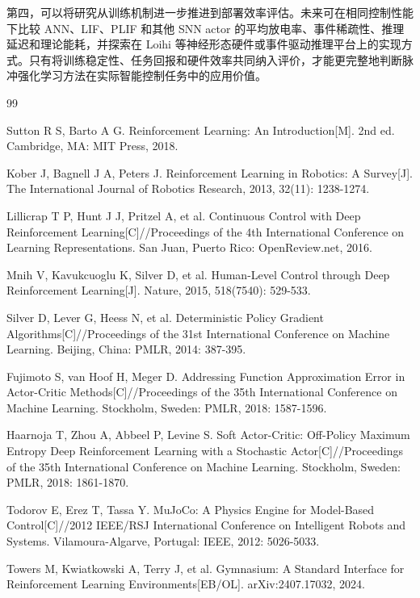 \documentclass[UTF8,zihao=-4,oneside,openany]{ctexbook}
\begin{document}
第四，可以将研究从训练机制进一步推进到部署效率评估。未来可在相同控制性能下比较 ANN、LIF、PLIF 和其他 SNN actor 的平均放电率、事件稀疏性、推理延迟和理论能耗，并探索在 Loihi 等神经形态硬件或事件驱动推理平台上的实现方式。只有将训练稳定性、任务回报和硬件效率共同纳入评价，才能更完整地判断脉冲强化学习方法在实际智能控制任务中的应用价值。

\backmatter
{}
\begin{thebibliography}{99}
Sutton R S, Barto A G. Reinforcement Learning: An Introduction[M]. 2nd ed. Cambridge, MA: MIT Press, 2018.

Kober J, Bagnell J A, Peters J. Reinforcement Learning in Robotics: A Survey[J]. The International Journal of Robotics Research, 2013, 32(11): 1238-1274.

Lillicrap T P, Hunt J J, Pritzel A, et al. Continuous Control with Deep Reinforcement Learning[C]//Proceedings of the 4th International Conference on Learning Representations. San Juan, Puerto Rico: OpenReview.net, 2016.

Mnih V, Kavukcuoglu K, Silver D, et al. Human-Level Control through Deep Reinforcement Learning[J]. Nature, 2015, 518(7540): 529-533.

Silver D, Lever G, Heess N, et al. Deterministic Policy Gradient Algorithms[C]//Proceedings of the 31st International Conference on Machine Learning. Beijing, China: PMLR, 2014: 387-395.

Fujimoto S, van Hoof H, Meger D. Addressing Function Approximation Error in Actor-Critic Methods[C]//Proceedings of the 35th International Conference on Machine Learning. Stockholm, Sweden: PMLR, 2018: 1587-1596.

Haarnoja T, Zhou A, Abbeel P, Levine S. Soft Actor-Critic: Off-Policy Maximum Entropy Deep Reinforcement Learning with a Stochastic Actor[C]//Proceedings of the 35th International Conference on Machine Learning. Stockholm, Sweden: PMLR, 2018: 1861-1870.

Todorov E, Erez T, Tassa Y. MuJoCo: A Physics Engine for Model-Based Control[C]//2012 IEEE/RSJ International Conference on Intelligent Robots and Systems. Vilamoura-Algarve, Portugal: IEEE, 2012: 5026-5033.

Towers M, Kwiatkowski A, Terry J, et al. Gymnasium: A Standard Interface for Reinforcement Learning Environments[EB/OL]. arXiv:2407.17032, 2024.


\end{thebibliography}
\end{document}
